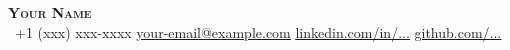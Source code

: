 \begin{center}
    \textbf{\Huge \scshape Your Name} \\ \vspace{1pt}
     \ \small +1 (xxx) xxx-xxxx \quad
    \href{mailto:your-email@example.com}{ \underline{your-email@example.com}} \quad
    \href{https://www.linkedin.com/in/...}{ \underline{linkedin.com/in/...}} \quad
    \href{https://github.com/...}{ \underline{github.com/...}}
\end{center}